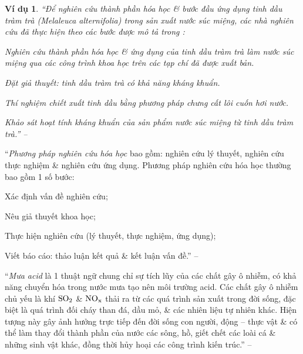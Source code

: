 \documentclass{article}
\numberwithin{equation}{section}
\newtheorem{vidu}{Ví dụ}[section]
\begin{document}
\begin{vidu}
	``Để nghiên cứu thành phần hóa học \& bước đầu ứng dụng tinh dầu tràm trà (\emph{Melaleuca alternifolia}) trong sản xuất nước súc miệng, các nhà nghiên cứu đã thực hiện theo các bước được mô tả trong  \cite[Hình 1.12: \textsf{Các bước thực hiện trong đề tài nghiên cứu thành phần hóa học \& bước đầu ứng dụng tinh dầu tràm trà trong sản xuất nước súc miệng}, p. 10]{SGK_Hoa_Hoc_10_Chan_Troi_Sang_Tao}:
	\begin{enumerate*}
		\item[\textbf{1.}] Nghiên cứu thành phần hóa học \& ứng dụng của tinh dầu tràm trà làm nước súc miệng qua các công trình khoa học trên các tạp chí đã được xuất bản.
		\item[\textbf{2.}] Đặt giả thuyết: tinh dầu tràm trà có khả năng kháng khuẩn.
		\item[\textbf{3.}] Thí nghiệm chiết xuất tinh dầu bằng phương pháp chưng cất lôi cuốn hơi nước.
		\item[\textbf{4.}] Khảo sát hoạt tính kháng khuẩn của sản phẩm nước súc miệng từ tinh dầu tràm trà.'' -- \cite[p. 10]{SGK_Hoa_Hoc_10_Chan_Troi_Sang_Tao}
	\end{enumerate*}
\end{vidu}
``\textit{Phương pháp nghiên cứu hóa học} bao gồm: nghiên cứu lý thuyết, nghiên cứu thực nghiệm \& nghiên cứu ứng dụng. Phương pháp nghiên cứu hóa học thường bao gồm 1 số bước:
\begin{enumerate*}
	\item[\textbf{1.}] Xác định vấn đề nghiên cứu;
	\item[\textbf{2.}] Nêu giả thuyết khoa học;
	\item[\textbf{3.}] Thực hiện nghiên cứu (lý thuyết, thực nghiệm, ứng dụng);
	\item[\textbf{4.}] Viết báo cáo: thảo luận kết quả \& kết luận vấn đề.'' -- \cite[p. 11]{SGK_Hoa_Hoc_10_Chan_Troi_Sang_Tao}
\end{enumerate*}
``\textit{Mưa acid} là 1 thuật ngữ chung chỉ sự tích lũy của các chất gây ô nhiễm, có khả năng chuyển hóa trong nước mưa tạo nên môi trường acid. Các chất gây ô nhiễm chủ yếu là khí $\rm SO_2$ \& $\rm NO_x$ thải ra từ các quá trình sản xuất trong đời sống, đặc biệt là quá trình đối cháy than đá, dầu mỏ, \& các nhiên liệu tự nhiên khác. Hiện tượng này gây ảnh hưởng trực tiếp đến đời sống con người, động -- thực vật \& có thể làm thay đổi thành phần của nước các sông, hồ, giết chết các loài cá \& những sinh vật khác, đồng thời hủy hoại các công trình kiến trúc.'' -- \cite[p. 11]{SGK_Hoa_Hoc_10_Chan_Troi_Sang_Tao}
\end{document}
